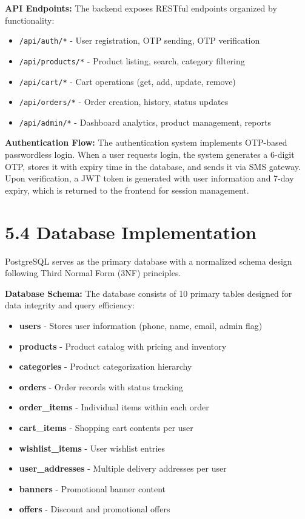 \documentclass[12pt,a4paper]{report}
\begin{document}
\textbf{API Endpoints:}
The backend exposes RESTful endpoints organized by functionality:
\begin{itemize}
    \item \texttt{/api/auth/*} - User registration, OTP sending, OTP verification
    \item \texttt{/api/products/*} - Product listing, search, category filtering
    \item \texttt{/api/cart/*} - Cart operations (get, add, update, remove)
    \item \texttt{/api/orders/*} - Order creation, history, status updates
    \item \texttt{/api/admin/*} - Dashboard analytics, product management, reports
\end{itemize}

\textbf{Authentication Flow:}
The authentication system implements OTP-based passwordless login. When a user requests login, the system generates a 6-digit OTP, stores it with expiry time in the database, and sends it via SMS gateway. Upon verification, a JWT token is generated with user information and 7-day expiry, which is returned to the frontend for session management.

\section*{5.4 Database Implementation}

PostgreSQL serves as the primary database with a normalized schema design following Third Normal Form (3NF) principles.

\textbf{Database Schema:}
The database consists of 10 primary tables designed for data integrity and query efficiency:
\begin{itemize}
    \item \textbf{users} - Stores user information (phone, name, email, admin flag)
    \item \textbf{products} - Product catalog with pricing and inventory
    \item \textbf{categories} - Product categorization hierarchy
    \item \textbf{orders} - Order records with status tracking
    \item \textbf{order\_items} - Individual items within each order
    \item \textbf{cart\_items} - Shopping cart contents per user
    \item \textbf{wishlist\_items} - User wishlist entries
    \item \textbf{user\_addresses} - Multiple delivery addresses per user
    \item \textbf{banners} - Promotional banner content
    \item \textbf{offers} - Discount and promotional offers
\end{itemize}
\end{document}
